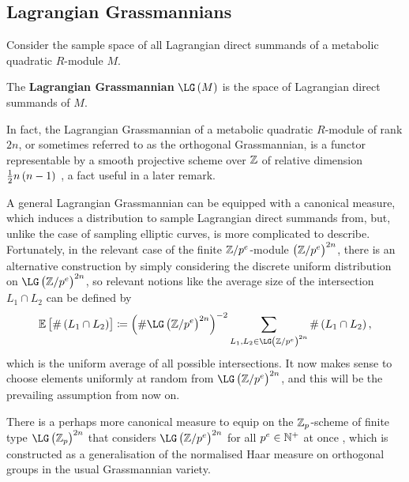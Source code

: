 \subsection{Lagrangian Grassmannians}

Consider the sample space of all Lagrangian direct summands of a metabolic quadratic $ R $-module $ M $.

\begin{definition}
The \textbf{Lagrangian Grassmannian} $ \LG\br{M} $ is the space of Lagrangian direct summands of $ M $.
\end{definition}

\begin{remark}
In fact, the Lagrangian Grassmannian of a metabolic quadratic $ R $-module of rank $ 2n $, or sometimes referred to as the orthogonal Grassmannian, is a functor representable by a smooth projective scheme over $ \mathbb{Z} $ of relative dimension $ \tfrac{1}{2}n\br{n - 1} $ \cite[Proposition 4.4]{BKLPR15}, a fact useful in a later remark.
\end{remark}

A general Lagrangian Grassmannian can be equipped with a canonical measure, which induces a distribution to sample Lagrangian direct summands from, but, unlike the case of sampling elliptic curves, is more complicated to describe. Fortunately, in the relevant case of the finite $ \mathbb{Z} / p^e $-module $ \br{\ZZ / p^e}^{2n} $, there is an alternative construction by simply considering the discrete uniform distribution on $ \LG\br{\ZZ / p^e}^{2n} $, so relevant notions like the average size of the intersection $ L_1 \cap L_2 $ can be defined by
$$ \EE\sbr{\#\br{L_1 \cap L_2}} \coloneqq \br{\#\LG\br{\ZZ / p^e}^{2n}}^{-2}\sum_{L_1, L_2 \in \LG\br{\ZZ / p^e}^{2n}} \#\br{L_1 \cap L_2}, $$
which is the uniform average of all possible intersections. It now makes sense to choose elements uniformly at random from $ \LG\br{\ZZ / p^e}^{2n} $, and this will be the prevailing assumption from now on.

\begin{remark}
There is a perhaps more canonical measure to equip on the $ \mathbb{Z}_p $-scheme of finite type $ \LG\br{\ZZ_p}^{2n} $ that considers $ \LG\br{\ZZ / p^e}^{2n} $ for all $ p^e \in \mathbb{N}^+ $ at once \cite[Proposition 2.1]{BKLPR15}, which is constructed as a generalisation of the normalised Haar measure on orthogonal groups in the usual Grassmannian variety.
\end{remark}

\pagebreak

